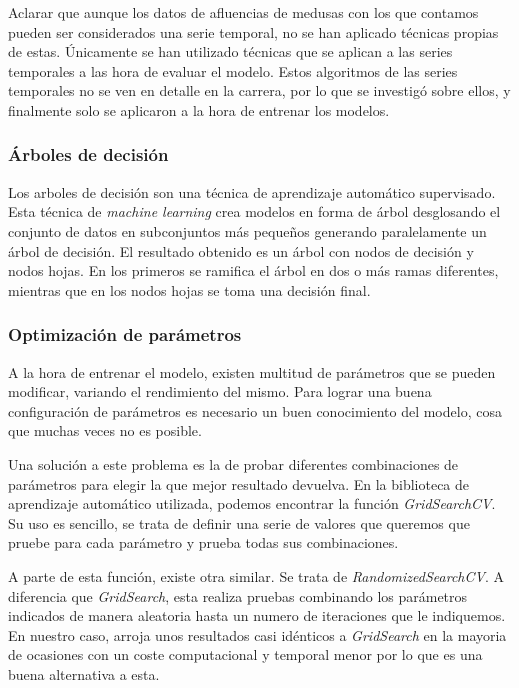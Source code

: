 Aclarar que aunque los datos de afluencias de medusas con los que contamos pueden ser considerados una serie temporal, no se han aplicado técnicas propias de estas. Únicamente se han utilizado técnicas que se aplican a las series temporales a las hora de evaluar el modelo. Estos algoritmos de las series temporales no se ven en detalle en la carrera, por lo que se investigó sobre ellos, y finalmente solo se aplicaron a la hora de entrenar los modelos.

\subsubsection{Árboles de decisión}

Los arboles de decisión son una técnica de aprendizaje automático supervisado. Esta técnica de \emph{machine learning} crea modelos en forma de árbol  desglosando el conjunto de datos en subconjuntos más pequeños generando paralelamente un árbol de decisión. El resultado obtenido es un árbol con nodos de decisión y nodos hojas. En los primeros se ramifica el árbol en dos o más ramas diferentes, mientras que en los nodos hojas se toma una decisión final.

\subsubsection{Optimización de parámetros}

A la hora de entrenar el modelo, existen multitud de parámetros que se pueden modificar, variando el rendimiento del mismo. Para lograr una buena configuración de parámetros es necesario un buen conocimiento del modelo, cosa que muchas veces no es posible.

Una solución a este problema es la de probar diferentes combinaciones de parámetros para elegir la que mejor resultado devuelva. En la biblioteca de aprendizaje automático utilizada, podemos encontrar la función \emph{GridSearchCV}. Su uso es sencillo, se trata de definir una serie de valores que queremos que pruebe para cada parámetro y prueba todas sus combinaciones.



A parte de esta función, existe otra similar. Se trata de \emph{RandomizedSearchCV}. A diferencia que \emph{GridSearch}, esta realiza pruebas combinando los parámetros indicados de manera aleatoria hasta un numero de iteraciones que le indiquemos. En nuestro caso, arroja unos resultados casi idénticos a \emph{GridSearch} en la mayoria de ocasiones con un coste computacional y temporal menor por lo que es una buena alternativa a esta.